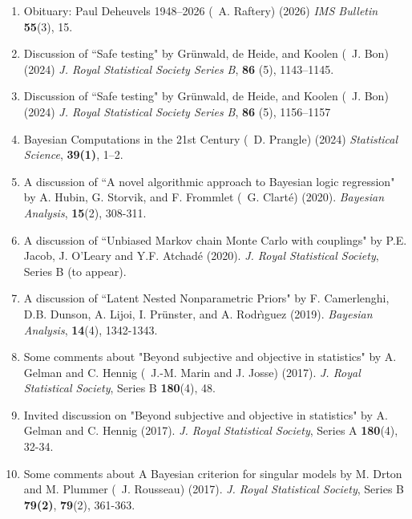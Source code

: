 \medskip
\begin{enumerate}
\renewcommand{\theenumi}{[D-\arabic{enumi}]}
\item Obituary: Paul Deheuvels 1948--2026 (\avec~A. Raftery) (2026)
{\em IMS Bulletin} {\bf 55}(3), 15.

\item Discussion of ``Safe testing" by Grünwald, de Heide, and Koolen (\avec~J. Bon) (2024)
{\em J. Royal Statistical Society Series B}, {\bf 86} (5), 1143--1145.

\item Discussion of ``Safe testing" by Grünwald, de Heide, and Koolen (\avec~J. Bon) (2024)
{\em J. Royal Statistical Society Series B}, {\bf 86} (5), 1156--1157

\item Bayesian Computations in the 21st Century (\avec~D. Prangle)  (2024)
{\em Statistical Science}, {\bf 39(1)}, 1--2.

\item A discussion of ``A novel algorithmic approach to Bayesian logic regression" by A. Hubin, G. Storvik, and F. Frommlet (\avec~G. Clarté) (2020). {\em Bayesian Analysis}, {\bf 15}(2), 308-311.

\item A discussion of ``Unbiased Markov chain Monte Carlo with couplings" by P.E. Jacob, J. O'Leary and Y.F. Atchadé (2020). {\em J. Royal Statistical Society}, Series B (to appear). %

\item A discussion of ``Latent Nested Nonparametric Priors" by F. Camerlenghi, D.B. Dunson, A. Lijoi, I. Pr{\"u}nster, and A. Rodr{\`\i}guez (2019). {\em Bayesian Analysis}, {\bf 14}(4), 1342-1343.

\item Some comments about "Beyond subjective and objective in statistics" by A. Gelman and C. Hennig (\avec~J.-M. Marin and J. Josse) (2017). {\em J. Royal Statistical Society}, Series B {\bf 180}(4), 48.

\item Invited discussion on "Beyond subjective and objective in statistics" by A. Gelman and C. Hennig (2017). 
{\em J. Royal Statistical Society}, Series A {\bf 180}(4), 32-34.

\item Some comments about A Bayesian criterion for singular models by M. Drton and M. Plummer (\avec\ J. Rousseau) (2017). {\em J. Royal Statistical Society}, Series B {\bf 79(2)}, {\bf 79}(2), 361-363.%


\end{enumerate}
